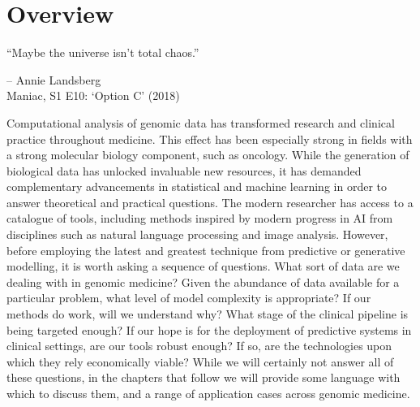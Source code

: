 \documentclass[thesis.tex]{subfiles}
\begin{document}
\section{Overview} 
\epigraph{``Maybe the universe isn’t total chaos.''}{-- Annie Landsberg \\ Maniac, S1 E10: `Option C' (2018)}
Computational analysis of genomic data has transformed research and clinical practice throughout medicine. This effect has been especially strong in fields with a strong molecular biology component, such as oncology. While the generation of biological data has unlocked invaluable new resources, it has demanded complementary advancements in statistical and machine learning in order to answer theoretical and practical questions. The modern researcher has access to a catalogue of tools, including methods inspired by modern progress in AI from disciplines such as natural language processing and image analysis. However, before employing the latest and greatest technique 
from predictive or generative modelling, it is worth asking a sequence of questions. What sort of data are we dealing with in genomic medicine? Given the abundance of data available for a particular problem, what level of model complexity is appropriate? If our methods do work, will we understand why? What stage of the clinical pipeline is being targeted enough? If our hope is for the deployment of predictive systems in clinical settings, are our tools robust enough? If so, are the technologies upon which they rely economically viable? While we will certainly not answer all of these questions, in the chapters that follow we will provide some language with which to discuss them, and a range of application cases across genomic medicine. 
\end{document}
